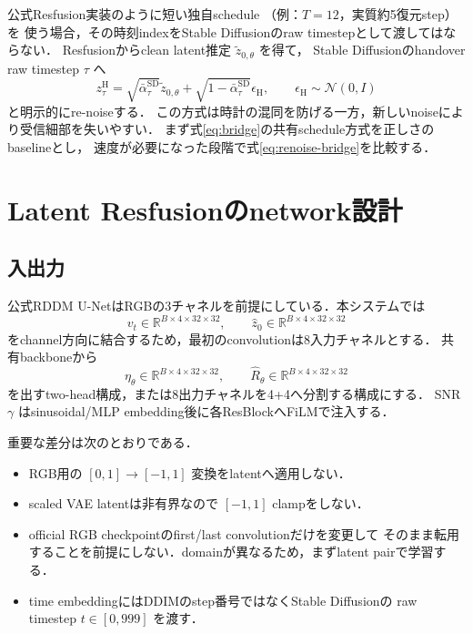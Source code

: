 \documentclass[11pt,a4paper]{ltjsarticle}
\newcommand{\N}{\mathcal{N}}
\newcommand{\R}{\mathbb{R}}
\begin{document}
公式Resfusion実装\cite{resfusion-code}のように短い独自schedule
（例：\(T=12\)，実質約5復元step）を
使う場合，その時刻indexをStable Diffusionのraw timestepとして渡してはならない．
Resfusionからclean latent推定 \(\tilde z_{0,\theta}\) を得て，
Stable Diffusionのhandover raw timestep \(\tau\) へ
\begin{equation}
  z_\tau^{\mathrm H}
  =
  \sqrt{\bar\alpha_\tau^{\mathrm{SD}}}
  \tilde z_{0,\theta}
  +
  \sqrt{1-\bar\alpha_\tau^{\mathrm{SD}}}
  \epsilon_{\mathrm H},
  \qquad
  \epsilon_{\mathrm H}\sim\N(0,I)
\label{eq:renoise-bridge}
\end{equation}
と明示的にre-noiseする．
この方式は時計の混同を防げる一方，新しいnoiseにより受信細部を失いやすい．
まず式\eqref{eq:bridge}の共有schedule方式を正しさのbaselineとし，
速度が必要になった段階で式\eqref{eq:renoise-bridge}を比較する．

\section{Latent Resfusionのnetwork設計}

\subsection{入出力}

公式RDDM U-NetはRGBの3チャネルを前提にしている．本システムでは
\[
  v_t\in\R^{B\times4\times32\times32},\qquad
  \hat z_0\in\R^{B\times4\times32\times32}
\]
をchannel方向に結合するため，最初のconvolutionは8入力チャネルとする．
共有backboneから
\[
  \eta_\theta\in\R^{B\times4\times32\times32},
  \qquad
  \hat R_\theta\in\R^{B\times4\times32\times32}
\]
を出すtwo-head構成，または8出力チャネルを4+4へ分割する構成にする．
SNR \(\gamma\) はsinusoidal/MLP embedding後に各ResBlockへFiLMで注入する．

重要な差分は次のとおりである．
\begin{itemize}
  \item RGB用の \([0,1]\to[-1,1]\) 変換をlatentへ適用しない．
  \item scaled VAE latentは非有界なので \([-1,1]\) clampをしない．
  \item official RGB checkpointのfirst/last convolutionだけを変更して
        そのまま転用することを前提にしない．domainが異なるため，まずlatent pairで学習する．
  \item time embeddingにはDDIMのstep番号ではなくStable Diffusionの
        raw timestep \(t\in[0,999]\) を渡す．
\end{itemize}
\end{document}
